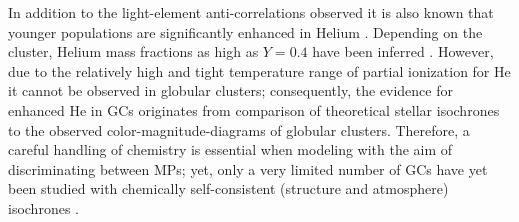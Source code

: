In addition to the light-element anti-correlations observed it is also known
that younger populations are significantly enhanced in Helium
\citep{Piotto2007, Piotto2015, Latour2019}. Depending on the cluster, Helium
mass fractions as high as $Y=0.4$ have been inferred \citep[e.g][]{Milone2015}.
However, due to the relatively high and tight temperature range of partial
ionization for He it cannot be observed in globular clusters; consequently, the
evidence for enhanced He in GCs originates from comparison of theoretical
stellar isochrones to the observed color-magnitude-diagrams of globular
clusters. Therefore, a careful handling of chemistry is essential when modeling
with the aim of discriminating between MPs; yet, only a very limited number of
GCs have yet been studied with chemically self-consistent (structure and
atmosphere) isochrones \citep[e.g.][NGC 6752]{Dotter2015}. 



